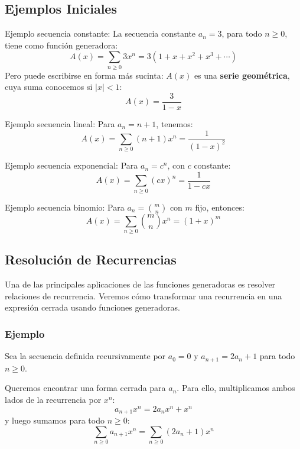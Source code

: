 \subsection{Ejemplos Iniciales}

\begin{exampleblock}{Ejemplo secuencia constante:}
La secuencia constante $a_n = 3$, para todo $n \geq 0$, tiene como función generadora:
\[
A(x) = \sum_{n \geq 0} 3x^n = 3(1 + x + x^2 + x^3 + \cdots)
\]
Pero puede escribirse en forma más sucinta: $A(x)$ es una \textbf{serie geométrica}, cuya suma conocemos si $|x| < 1$:
\[
A(x) = \frac{3}{1 - x}
\]
\end{exampleblock}

\begin{exampleblock}{Ejemplo secuencia lineal:}
Para $a_n = n+1$, tenemos:
\[
A(x) = \sum_{n \geq 0} (n+1)x^n = \frac{1}{(1 - x)^2}
\]
\end{exampleblock}



\begin{exampleblock}{Ejemplo secuencia exponencial:}
Para $a_n = c^n$, con $c$ constante:
\[
A(x) = \sum_{n \geq 0} (cx)^n = \frac{1}{1 - cx}
\]
\end{exampleblock}

\begin{exampleblock}{Ejemplo secuencia binomio:}
Para $a_n = \binom{m}{n}$ con $m$ fijo, entonces:
\[
A(x) = \sum_{n \geq 0} \binom{m}{n} x^n = (1 + x)^m
\]
\end{exampleblock}

\subsection{Resolución de Recurrencias}

Una de las principales aplicaciones de las funciones generadoras es resolver relaciones de recurrencia. Veremos cómo transformar una recurrencia en una expresión cerrada usando funciones generadoras.

\subsubsection*{Ejemplo}
Sea la secuencia definida recursivamente por $a_0 = 0$ y $a_{n+1} = 2a_n + 1$ para todo $n \geq 0$.

Queremos encontrar una forma cerrada para $a_n$. Para ello, multiplicamos ambos lados de la recurrencia por $x^n$:
\[
a_{n+1}x^n = 2a_n x^n + x^n
\]
y luego sumamos para todo $n \geq 0$:
\[
\sum_{n \geq 0} a_{n+1} x^n = \sum_{n \geq 0} (2a_n + 1)x^n
\]


